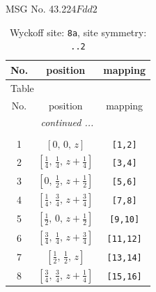 \documentclass[fleqn,8pt]{jsarticle}
\begin{document}
\setcounter{MaxMatrixCols}{32}

\renewcommand{\tablename}{Table~}
\renewcommand{\figurename}{Figure~}
\begin{center}
\LARGE
MSG No. 43.224\quad$Fdd2$
\end{center}
\renewcommand{\arraystretch}{1.2}
\begin{longtable}{ccc}
\caption{Wyckoff site: {\tt 8a}, site symmetry: {\tt ..2}}
 \\
 \hline \hline
No. & position & mapping \\ \hline \endfirsthead

\multicolumn{2}{l}{\tablename\ \thetable{}} \\
 \hline \hline
No. & position & mapping \\ \hline \endhead

 \hline \hline
\multicolumn{2}{r}{\footnotesize\it continued ...} \\ \endfoot

 \hline \hline
\multicolumn{2}{r}{} \\ \endlastfoot

1 & $\left[ 0,\, 0,\, z \right]$ & {\tt [1,2]} \\ \hline
2 & $\left[ \frac{1}{4},\, \frac{1}{4},\, z + \frac{1}{4} \right]$ & {\tt [3,4]} \\ \hline
3 & $\left[ 0,\, \frac{1}{2},\, z + \frac{1}{2} \right]$ & {\tt [5,6]} \\ \hline
4 & $\left[ \frac{1}{4},\, \frac{3}{4},\, z + \frac{3}{4} \right]$ & {\tt [7,8]} \\ \hline
5 & $\left[ \frac{1}{2},\, 0,\, z + \frac{1}{2} \right]$ & {\tt [9,10]} \\ \hline
6 & $\left[ \frac{3}{4},\, \frac{1}{4},\, z + \frac{3}{4} \right]$ & {\tt [11,12]} \\ \hline
7 & $\left[ \frac{1}{2},\, \frac{1}{2},\, z \right]$ & {\tt [13,14]} \\ \hline
8 & $\left[ \frac{3}{4},\, \frac{3}{4},\, z + \frac{1}{4} \right]$ & {\tt [15,16]} \\
\end{longtable}
\renewcommand{\arraystretch}{1.2}
\end{document}
